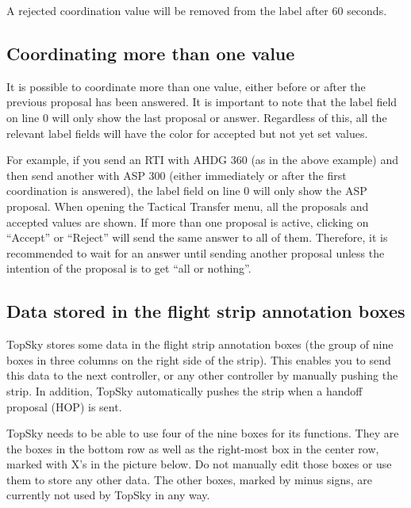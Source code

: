\documentclass[a4paper,oneside,11pt]{memoir}
\begin{document}
\bigskip

A rejected coordination value will be removed from the label after 60 seconds.


\subsection{Coordinating more than one value}

It is possible to coordinate more than one value, either before or after the previous proposal has been answered. It is important to note that the label field on line 0 will only show the last proposal or answer. Regardless of this, all the relevant label fields will have the  color for accepted but not yet set values.

\bigskip

For example, if you send an RTI with AHDG 360 (as in the above example) and then send another with ASP 300 (either immediately or after the first coordination is answered), the label field on line 0 will only show the ASP proposal. When opening the Tactical Transfer menu, all the proposals and accepted values are shown. If more than one proposal is active, clicking on “Accept” or “Reject” will send the same answer to all of them. Therefore, it is recommended to wait for an answer until sending another proposal unless the intention of the proposal is to get “all or nothing”.

\subsection{Data stored in the flight strip annotation boxes}

TopSky stores some data in the flight strip annotation boxes (the group of nine boxes in three columns on the right side of the strip). This enables you to send this data to the next controller, or any other controller by manually pushing the strip. In addition, TopSky automatically pushes the strip when a handoff proposal (HOP) is sent.

\bigskip

TopSky needs to be able to use four of the nine boxes for its functions. They are the boxes in the bottom row as well as the right-most box in the center row, marked with X’s in the picture below. Do not manually edit those boxes or use them to store any other data. The other boxes, marked by minus signs, are currently not used by TopSky in any way.
\end{document}
